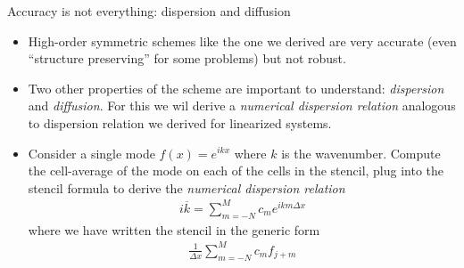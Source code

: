 \documentclass[aspectratio=169]{beamer}
\newcommand{\mypause}{}
\begin{document}
\begin{frame}{Accuracy is not everything: dispersion and diffusion}
  \footnotesize
  \begin{itemize}
  \item High-order symmetric schemes like the one we derived are very
    accurate (even ``structure preserving'' for some problems) but not
    robust.
    \mypause%
  \item Two other properties of the scheme are important to
    understand: \emph{dispersion} and \emph{diffusion}. For this we
    wil derive a \emph{numerical dispersion relation} analogous to
    dispersion relation we derived for linearized systems.
    \mypause%
  \item Consider a single mode $f(x) = e^{ik x}$ where $k$ is the
    wavenumber. Compute the cell-average of the mode on each of the
    cells in the stencil, plug into the stencil formula to derive the
    \emph{numerical dispersion relation}
    \begin{align*}
      i\overline{k} = \sum_{m=-N}^{M} c_m e^{i k m \Delta x}
    \end{align*}
    where we have written the stencil in the generic form
    \begin{align*}
      \frac{1}{\Delta x}\sum_{m = -N}^{M} c_m f_{j+m}
    \end{align*}

  \end{itemize}
\end{frame}
\end{document}

